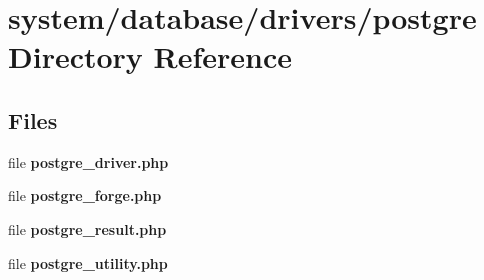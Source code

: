 \section{system/database/drivers/postgre Directory Reference}
\label{dir_4ba92a8732cb8d5ea7936cf1d07058a7}
\subsection*{Files}
\begin{DoxyCompactItemize}
\item 
file {\bf postgre\-\_\-driver.\-php}
\item 
file {\bf postgre\-\_\-forge.\-php}
\item 
file {\bf postgre\-\_\-result.\-php}
\item 
file {\bf postgre\-\_\-utility.\-php}
\end{DoxyCompactItemize}
